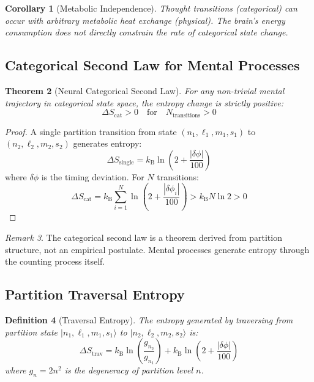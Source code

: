 \documentclass[aps,prd,twocolumn,superscriptaddress,floatfix,nofootinbib]{revtex4-2}
\newtheorem{theorem}{Theorem}[section]
\newtheorem{corollary}[theorem]{Corollary}
\newtheorem{definition}[theorem]{Definition}
\theoremstyle{remark}
\newtheorem{remark}[theorem]{Remark}
\newcommand{\kB}{k_{\mathrm{B}}}
\newcommand{\Scatent}{S_{\mathrm{cat}}}
\begin{document}
\begin{corollary}[Metabolic Independence]
\label{cor:metabolic_indep}
Thought transitions (categorical) can occur with arbitrary metabolic heat exchange (physical). The brain's energy consumption does not directly constrain the rate of categorical state change.
\end{corollary}

\subsection{Categorical Second Law for Mental Processes}

\begin{theorem}[Neural Categorical Second Law]
\label{thm:neural_second_law}
For any non-trivial mental trajectory in categorical state space, the entropy change is strictly positive:
\begin{equation}
\Delta \Scatent > 0 \quad \text{for} \quad N_{\text{transitions}} > 0
\end{equation}
\end{theorem}

\begin{proof}
A single partition transition from state $(n_1, \ell_1, m_1, s_1)$ to $(n_2, \ell_2, m_2, s_2)$ generates entropy:
\begin{equation}
\Delta S_{\text{single}} = \kB \ln\left(2 + \frac{|\delta\phi|}{100}\right)
\end{equation}
where $\delta\phi$ is the timing deviation. For $N$ transitions:
\begin{equation}
\Delta \Scatent = \kB \sum_{i=1}^{N} \ln\left(2 + \frac{|\delta\phi_i|}{100}\right) > \kB N \ln 2 > 0
\end{equation}
\end{proof}

\begin{remark}
The categorical second law is a theorem derived from partition structure, not an empirical postulate. Mental processes generate entropy through the counting process itself.
\end{remark}

\subsection{Partition Traversal Entropy}

\begin{definition}[Traversal Entropy]
\label{def:traversal_entropy}
The entropy generated by traversing from partition state $|n_1, \ell_1, m_1, s_1\rangle$ to $|n_2, \ell_2, m_2, s_2\rangle$ is:
\begin{equation}
\Delta S_{\text{trav}} = \kB \ln\left(\frac{g_{n_2}}{g_{n_1}}\right) + \kB \ln\left(2 + \frac{|\delta\phi|}{100}\right)
\end{equation}
where $g_n = 2n^2$ is the degeneracy of partition level $n$.
\end{definition}
\end{document}
